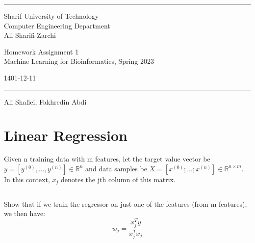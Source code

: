 \documentclass[a4paper]{article}
\begin{document}
	
	
	\fancyhead[C]{}
	\hrule \medskip %
	\begin{minipage}{0.295\textwidth} 
		\raggedright
		\footnotesize
		  Sharif University of Technology \hfill\\   
		Computer Engineering Department\hfill\\
		Ali Sharifi-Zarchi
	\end{minipage}
	\begin{minipage}{0.4\textwidth} 
		\centering 
		\large 
		Homework Assignment 1\\ 
		\normalsize 
		Machine Learning for Bioinformatics, Spring 2023\\ 
	\end{minipage}
	\begin{minipage}{0.295\textwidth} 
		\raggedleft
		\small
            1401-12-11
            \hfill\\
	\end{minipage}
	\medskip\hrule 
	\bigskip
	

        \begin{center}
         Ali Shafiei, Fakhredin Abdi
        \end{center}

        \section{Linear Regression}
        Given n training data with m features, let the target value vector be $y = [y^{(0)},...,y^{(n)}] \in \mathbb{R}^n$
        and data samples be $X = [x^{(0)};...;x^{(n)}] \in \mathbb{R}^{n\times m}$. In this context, $x_j$ denotes the jth column of this matrix.
        
        \subsection{}
        Show that if we train the regressor on just one of the features (from m features), we then have: $$w_j=\frac{x_j^Ty}{x_j^Tx_j}$$
        
\end{document}
